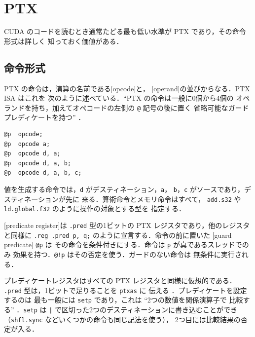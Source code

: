 \documentclass[../main.tex]{subfiles}
\begin{document}
\section{PTX}
\label{sec:l10-ptx}

CUDA のコードを読むとき通常たどる最も低い水準が PTX であり，その命令形式は詳しく
知っておく価値がある．

\subsection{命令形式}

PTX の命令は，演算の名前である[opcode]と，
[operand]の並びからなる．PTX ISA はこれを
次のように述べている．\enquote{PTX の命令は一般に0個から4個の
オペランドを持ち，加えてオペコードの左側の \texttt{@} 記号の後に置く
省略可能なガードプレディケートを持つ} \cite[§9.2]{nvidia2026ptx}．
\begin{lstlisting}[language=PTX, numbers=none]
@p  opcode;
@p  opcode a;
@p  opcode d, a;
@p  opcode d, a, b;
@p  opcode d, a, b, c;
\end{lstlisting}
値を生成する命令では，\texttt{d} がデスティネーション，\texttt{a}，
\texttt{b}，\texttt{c} がソースであり，デスティネーションが先に
来る．算術命令とメモリ命令はすべて，
\texttt{add.s32} や \texttt{ld.global.f32} のように操作の対象とする型を
指定する．

\begin{definition}
  [predicate register]は
  \texttt{.pred} 型の1ビットの PTX レジスタであり，他のレジスタと同様に
  \texttt{.reg .pred p, q;} のように宣言する．命令の前に置いた
  [guard predicate] \texttt{@p} は
  その命令を条件付きにする．命令は \texttt{p} が真であるスレッドでのみ
  効果を持つ．\texttt{@!p} はその否定を使う．ガードのない命令は
  無条件に実行される．
\end{definition}

プレディケートレジスタはすべての PTX レジスタと同様に仮想的である．
\texttt{.pred} 型は，1ビットで足りることを \texttt{ptxas} に
伝える \cite[§9.3]{nvidia2026ptx}．プレディケートを設定するのは
最も一般には \texttt{setp} であり，これは \enquote{2つの数値を関係演算子で
比較する} \cite[§9.7.7.2]{nvidia2026ptx}．\texttt{setp} は
\texttt{|} で区切った2つのデスティネーションに書き込むことができ
（\texttt{shfl.sync} などいくつかの命令も同じ記法を使う），
2つ目には比較結果の否定が入る．
\end{document}
